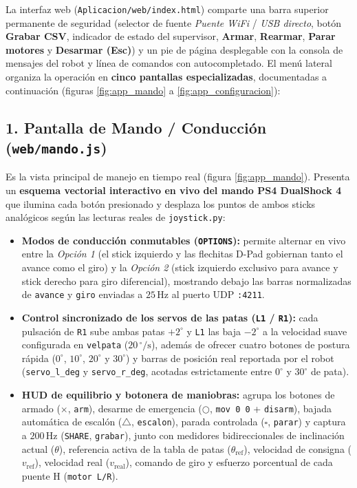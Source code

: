 \documentclass[11pt,a4paper]{report}
\newcommand{\ud}[1]{\,\mathrm{#1}}
\begin{document}
La interfaz web (\texttt{Aplicacion/web/index.html}) comparte una barra superior permanente de
seguridad (selector de fuente \emph{Puente WiFi} / \emph{USB directo}, botón \textbf{Grabar CSV},
indicador de estado del supervisor, \textbf{Armar}, \textbf{Rearmar}, \textbf{Parar motores} y
\textbf{Desarmar (Esc)}) y un pie de página desplegable con la consola de mensajes del robot y
línea de comandos con autocompletado. El menú lateral organiza la operación en \textbf{cinco
pantallas especializadas}, documentadas a continuación (figuras \ref{fig:app_mando} a
\ref{fig:app_configuracion}):

\subsection*{1. Pantalla de Mando / Conducción (\texttt{web/mando.js})}

Es la vista principal de manejo en tiempo real (figura \ref{fig:app_mando}). Presenta un
\textbf{esquema vectorial interactivo en vivo del mando PS4 DualShock 4} que ilumina cada botón
presionado y desplaza los puntos de ambos sticks analógicos según las lecturas reales de
\texttt{joystick.py}:
\begin{itemize}[leftmargin=1.5em]
\item \textbf{Modos de conducción conmutables (\texttt{OPTIONS}):} permite alternar en vivo entre
      la \emph{Opción 1} (el stick izquierdo y las flechitas D-Pad gobiernan tanto el avance como
      el giro) y la \emph{Opción 2} (stick izquierdo exclusivo para avance y stick derecho para
      giro diferencial), mostrando debajo las barras normalizadas de \texttt{avance} y \texttt{giro}
      enviadas a $25\ud{Hz}$ al puerto UDP \texttt{:4211}.
\item \textbf{Control sincronizado de los servos de las patas (\texttt{L1} / \texttt{R1}):} cada
      pulsación de \texttt{R1} sube ambas patas $+2^\circ$ y \texttt{L1} las baja $-2^\circ$ a la
      velocidad suave configurada en \texttt{velpata} ($20\ud{^\circ/s}$), además de ofrecer cuatro
      botones de postura rápida ($0^\circ$, $10^\circ$, $20^\circ$ y $30^\circ$) y barras de
      posición real reportada por el robot (\texttt{servo\_l\_deg} y \texttt{servo\_r\_deg},
      acotadas estrictamente entre $0^\circ$ y $30^\circ$ de pata).
\item \textbf{HUD de equilibrio y botonera de maniobras:} agrupa los botones de armado ($\times$,
      \texttt{arm}), desarme de emergencia ($\bigcirc$, \texttt{mov 0 0} + \texttt{disarm}),
      bajada automática de escalón ($\triangle$, \texttt{escalon}), parada controlada ($\square$,
      \texttt{parar}) y captura a $200\ud{Hz}$ (\texttt{SHARE}, \texttt{grabar}), junto con
      medidores bidireccionales de inclinación actual ($\theta$), referencia activa de la tabla de
      patas ($\theta_{\text{ref}}$), velocidad de consigna ($v_{\text{ref}}$), velocidad real
      ($v_{\text{real}}$), comando de giro y esfuerzo porcentual de cada puente H (\texttt{motor L/R}).
\end{itemize}
\end{document}
